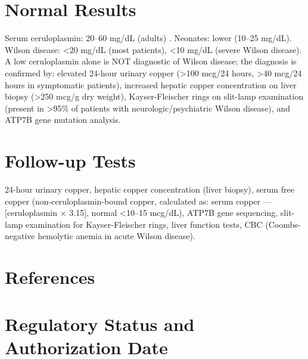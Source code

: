 \section*{Normal Results}
Serum ceruloplasmin: 20--60 mg/dL (adults) \cite{rifai2018tietz}. Neonates: lower (10--25 mg/dL). Wilson disease: <20 mg/dL (most patients), <10 mg/dL (severe Wilson disease). A low ceruloplasmin alone is NOT diagnostic of Wilson disease; the diagnosis is confirmed by: elevated 24-hour urinary copper (>100 mcg/24 hours, >40 mcg/24 hours in symptomatic patients), increased hepatic copper concentration on liver biopsy (>250 mcg/g dry weight), Kayser-Fleischer rings on slit-lamp examination (present in >95\% of patients with neurologic/psychiatric Wilson disease), and ATP7B gene mutation analysis.
\section*{Follow-up Tests}
24-hour urinary copper, hepatic copper concentration (liver biopsy), serum free copper (non-ceruloplasmin-bound copper, calculated as: serum copper --- [ceruloplasmin $\times$ 3.15], normal <10--15 mcg/dL), ATP7B gene sequencing, slit-lamp examination for Kayser-Fleischer rings, liver function tests, CBC (Coombs-negative hemolytic anemia in acute Wilson disease).
\section*{References}



\clearpage
\section*{Regulatory Status and Authorization Date}

\clearpage
